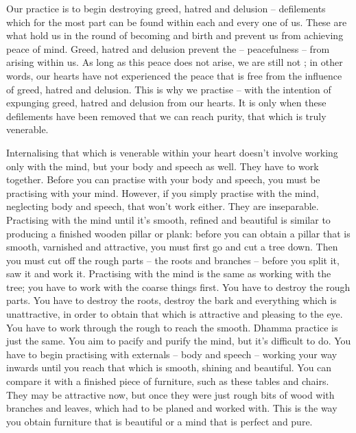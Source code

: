 Our practice is to begin destroying greed, hatred and delusion -- defilements which for the most part can be found within each and every one of us. These are what hold us in the round of becoming and birth and prevent us from achieving peace of mind. Greed, hatred and delusion prevent the  -- peacefulness -- from arising within us. As long as this peace does not arise, we are still not ; in other words, our hearts have not experienced the peace that is free from the influence of greed, hatred and delusion. This is why we practise -- with the intention of expunging greed, hatred and delusion from our hearts. It is only when these defilements have been removed that we can reach purity, that which is truly venerable.

Internalising that which is venerable within your heart doesn't involve working only with the mind, but your body and speech as well. They have to work together. Before you can practise with your body and speech, you must be practising with your mind. However, if you simply practise with the mind, neglecting body and speech, that won't work either. They are inseparable. Practising with the mind until it's smooth, refined and beautiful is similar to producing a finished wooden pillar or plank: before you can obtain a pillar that is smooth, varnished and attractive, you must first go and cut a tree down. Then you must cut off the rough parts -- the roots and branches -- before you split it, saw it and work it. Practising with the mind is the same as working with the tree; you have to work with the coarse things first. You have to destroy the rough parts. You have to destroy the roots, destroy the bark and everything which is unattractive, in order to obtain that which is attractive and pleasing to the eye. You have to work through the rough to reach the smooth. Dhamma practice is just the same. You aim to pacify and purify the mind, but it's difficult to do. You have to begin practising with externals -- body and speech -- working your way inwards until you reach that which is smooth, shining and beautiful. You can compare it with a finished piece of furniture, such as these tables and chairs. They may be attractive now, but once they were just rough bits of wood with branches and leaves, which had to be planed and worked with. This is the way you obtain furniture that is beautiful or a mind that is perfect and pure.

